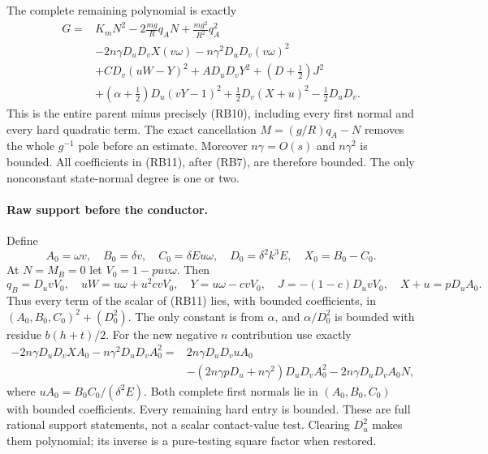 The complete remaining polynomial is exactly
\[
\begin{split}
 G={}&K_mN^2-2\frac{mg}{R}q_AN+\frac{mg^2}{R^2}q_A^2\\
 &-2n\gamma D_uD_vX(v\omega)-n\gamma^2D_uD_v(v\omega)^2\\
 &+CD_v(uW-Y)^2+AD_uD_vY^2+(D+\tfrac12)J^2\\
 &+(\alpha+\tfrac12)D_u(vY-1)^2
       +\tfrac12D_v(X+u)^2-\tfrac12D_uD_v.
\end{split}                                                     \tag{RB11}
\]
This is the entire parent minus precisely (RB10), including every
first normal and every hard quadratic term. The exact cancellation
$M=(g/R)q_A-N$ removes the whole $g^{-1}$ pole before an estimate.
Moreover $n\gamma=O(s)$ and $n\gamma^2$ is bounded. All coefficients
in (RB11), after (RB7), are therefore bounded. The only nonconstant
state-normal degree is one or two.

\paragraph{Raw support before the conductor.}
Define
\[
 A_0=\omega v,\quad B_0=\delta v,\quad C_0=\delta E u\omega,
 \quad D_0=\delta^2k^3E,\quad X_0=B_0-C_0.           \tag{RB12}
\]
At $N=M_B=0$ let $V_0=1-puv\omega$. Then
\[
 q_B=D_uvV_0,\quad uW=u\omega+u^2cvV_0,\quad
 Y=u\omega-cvV_0,\quad J=-(1-c)D_uvV_0,
 \quad X+u=pD_uA_0.                               \tag{RB13}
\]
Thus every term of the scalar of (RB11) lies, with bounded coefficients,
in $(A_0,B_0,C_0)^2+(D_0^2)$. The only constant is from $\alpha$,
and $\alpha/D_0^2$ is bounded with residue $b(h+t)/2$.
For the new negative $n$ contribution use exactly
\[
\begin{split}
 -2n\gamma D_uD_vX A_0-n\gamma^2D_uD_vA_0^2
 ={}&2n\gamma D_uD_vuA_0\\
 &-(2n\gamma pD_u+n\gamma^2)D_uD_vA_0^2
 -2n\gamma D_uD_vA_0N,
\end{split}                                                     \tag{RB14}
\]
where $uA_0=B_0C_0/(\delta^2E)$. Both complete first normals lie in
$(A_0,B_0,C_0)$ with bounded coefficients. Every remaining hard entry
is bounded. These are full rational support statements, not a scalar
contact-value test. Clearing $D_u^2$ makes them polynomial; its inverse
is a pure-testing square factor when restored.

